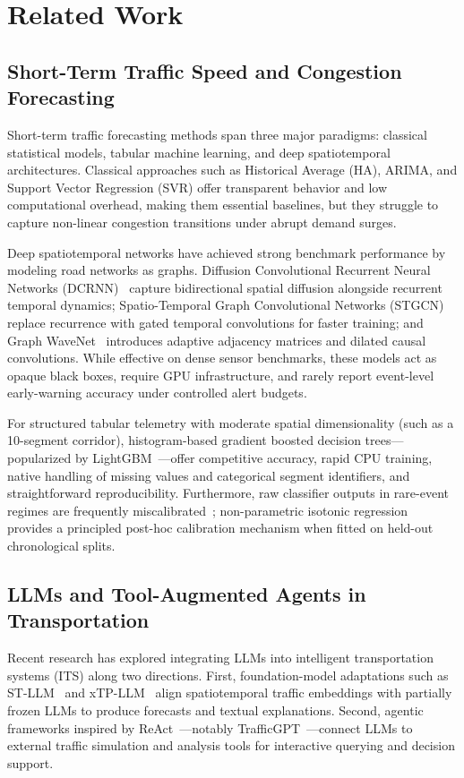 \section{Related Work}\label{sec:related}

\subsection{Short-Term Traffic Speed and Congestion Forecasting}
Short-term traffic forecasting methods span three major paradigms: classical statistical models, tabular machine learning, and deep spatiotemporal architectures. Classical approaches such as Historical Average (HA), ARIMA, and Support Vector Regression (SVR) offer transparent behavior and low computational overhead, making them essential baselines, but they struggle to capture non-linear congestion transitions under abrupt demand surges.

Deep spatiotemporal networks have achieved strong benchmark performance by modeling road networks as graphs. Diffusion Convolutional Recurrent Neural Networks (DCRNN)~\cite{li2018dcrnn} capture bidirectional spatial diffusion alongside recurrent temporal dynamics; Spatio-Temporal Graph Convolutional Networks (STGCN)~\cite{yu2018stgcn} replace recurrence with gated temporal convolutions for faster training; and Graph WaveNet~\cite{wu2019graphwavenet} introduces adaptive adjacency matrices and dilated causal convolutions. While effective on dense sensor benchmarks, these models act as opaque black boxes, require GPU infrastructure, and rarely report event-level early-warning accuracy under controlled alert budgets.

For structured tabular telemetry with moderate spatial dimensionality (such as a 10-segment corridor), histogram-based gradient boosted decision trees---popularized by LightGBM~\cite{ke2017lightgbm}---offer competitive accuracy, rapid CPU training, native handling of missing values and categorical segment identifiers, and straightforward reproducibility. Furthermore, raw classifier outputs in rare-event regimes are frequently miscalibrated~\cite{guo2017calibration}; non-parametric isotonic regression~\cite{zadrozny2002isotonic} provides a principled post-hoc calibration mechanism when fitted on held-out chronological splits.

\subsection{LLMs and Tool-Augmented Agents in Transportation}
Recent research has explored integrating LLMs into intelligent transportation systems (ITS) along two directions. First, foundation-model adaptations such as ST-LLM~\cite{liu2024stllm} and xTP-LLM~\cite{guo2024xtpllm} align spatiotemporal traffic embeddings with partially frozen LLMs to produce forecasts and textual explanations. Second, agentic frameworks inspired by ReAct~\cite{yao2023react}---notably TrafficGPT~\cite{zhang2024trafficgpt}---connect LLMs to external traffic simulation and analysis tools for interactive querying and decision support.


